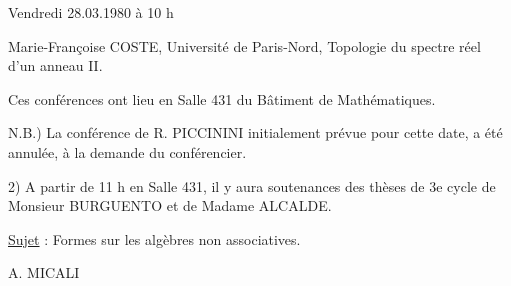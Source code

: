 Vendredi 28.03.1980 à 10 h

Marie-Françoise COSTE, Université de Paris-Nord, Topologie du spectre réel d'un anneau II.

Ces conférences ont lieu en Salle 431 du Bâtiment de Mathématiques.

N.B.) La conférence de R. PICCININI initialement prévue pour cette date, a été annulée, à la demande du conférencier.

2) A partir de 11 h en Salle 431, il y aura  soutenances des thèses de 3e cycle de Monsieur BURGUENTO et de Madame ALCALDE.

\uline{Sujet} : Formes sur les algèbres non associatives.

A. MICALI



